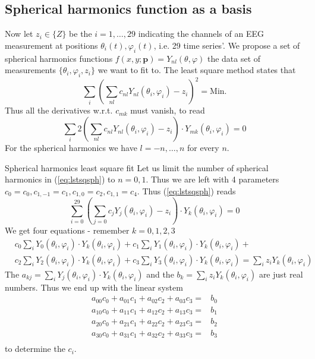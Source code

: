\subsection{Spherical harmonics function as a basis}
Now let $z_i\in\{Z\}$ be the $i=1,\dots,29$ indicating the channels of an EEG measurement at positions $\theta_i(t),\varphi_i(t)$, i.e. 29 time series'.
We propose a set of spherical harmonics functions $f(x,y;\mathbf{p})=Y_{nl}(\theta,\varphi)$ the data set of measurements $\{\theta_i,\varphi_i,z_i\}$ we want to fit to. The least square method states that
\[
\sum_i \left(\sum\limits_{nl}c_{nl}Y_{nl}(\theta_i,\varphi_i)-z_i\right)^2 = \text{Min}.
\]
Thus all the derivatives w.r.t. $c_{mk}$ must vanish, to read
\begin{equation}\label{eq:lstsqsph}
    \sum\limits_i2\left(\sum\limits_{nl}c_{nl}Y_{nl}(\theta_i,\varphi_i)-z_i\right)\cdot Y_{mk}(\theta_i,\varphi_i)=0
\end{equation}
For the spherical harmonics we have $l=-n,\dots,n$ for every $n$.
\begin{example}{Spherical harmonics least square fit}
Let us limit the number of spherical harmonics in (\ref{eq:lstsqsph}) to $n=0,1$. Thus we are left with 4 parameters $c_0=c_0,c_{1,-1}=c_1,c_{1,0}=c_2,c_{1,1}=c_4$. Thus (\ref{eq:lstsqsph}) reads
\[
\sum\limits_{i=0}^{29}
\left(\sum\limits_{j=0}c_{j}Y_{j}(\theta_i,\varphi_i)
-z_i\right)\cdot Y_{k}(\theta_i,\varphi_i)=0
\]
We get four equations - remember $k=0,1,2,3$
\begin{align*}
&c_{0}\sum\limits_{i}Y_{0}(\theta_i,\varphi_i)\cdot Y_{k}(\theta_i,\varphi_i)+
c_{1}\sum\limits_{i}Y_{1}(\theta_i,\varphi_i)\cdot Y_{k}(\theta_i,\varphi_i)+\\
&c_{2}\sum\limits_{i}Y_{2}(\theta_i,\varphi_i)\cdot Y_{k}(\theta_i,\varphi_i)+
c_{3}\sum\limits_{i}Y_{3}(\theta_i,\varphi_i)\cdot Y_{k}(\theta_i,\varphi_i)
=\sum\limits_{i}z_iY_{k}(\theta_i,\varphi_i)
\end{align*}
The $a_{kj}=\sum\limits_{i}Y_{j}(\theta_i,\varphi_i)\cdot Y_{k}(\theta_i,\varphi_i)$ and the $b_k=\sum\limits_{i}z_iY_{k}(\theta_i,\varphi_i)$ are just real numbers. Thus we end up with the linear system
\begin{align*}
    a_{00}c_0+a_{01}c_1+a_{02}c_2+a_{03}c_3=&b_0\\
    a_{10}c_0+a_{11}c_1+a_{12}c_2+a_{13}c_3=&b_1\\
    a_{20}c_0+a_{21}c_1+a_{22}c_2+a_{23}c_3=&b_2\\
    a_{30}c_0+a_{31}c_1+a_{32}c_2+a_{33}c_3=&b_3\\
\end{align*}
to determine the $c_i$.
\end{example}